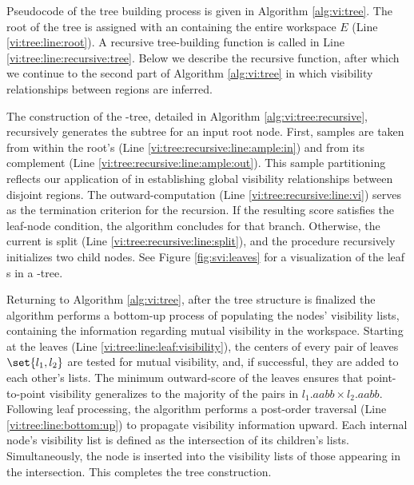 Pseudocode of the tree building process is given in Algorithm \ref{alg:vi:tree}. The root of the tree is assigned with an \aabb containing the entire workspace $E$ (Line \ref{vi:tree:line:root}). A recursive tree-building function is called in Line \ref{vi:tree:line:recursive:tree}. Below we describe the recursive function, after which we continue to the second part of Algorithm \ref{alg:vi:tree} in which visibility relationships between regions are inferred. 



The construction of the \vi-tree, detailed in Algorithm \ref{alg:vi:tree:recursive}, recursively generates the subtree for an input root node. First, samples are taken from within the root's \aabb (Line \ref{vi:tree:recursive:line:ample:in}) and from its complement (Line \ref{vi:tree:recursive:line:ample:out}). This sample partitioning reflects our application of \vi in establishing global visibility relationships between disjoint regions. The outward-\vi computation (Line \ref{vi:tree:recursive:line:vi}) serves as the termination criterion for the recursion. If the resulting score satisfies the leaf-node condition, the algorithm concludes for that branch. Otherwise, the current \aabb is split (Line \ref{vi:tree:recursive:line:split}), and the procedure recursively initializes two child nodes. See Figure \ref{fig:svi:leaves} for a visualization of the leaf \aabb{}s in a \vi-tree. 



Returning to Algorithm \ref{alg:vi:tree}, after the tree structure is finalized the algorithm performs a bottom-up process of populating the nodes' visibility lists, containing the information regarding mutual visibility in the workspace. Starting at the leaves (Line \ref{vi:tree:line:leaf:visibility}), the centers of every pair of leaves $\set{l_1,l_2}$ are tested for mutual visibility, and, if successful, they are added to each other's lists. The minimum outward-\vi score of the leaves ensures that point-to-point visibility generalizes to the majority of the pairs in $l_1.aabb \times l_2.aabb$. Following leaf processing, the algorithm performs a post-order traversal (Line \ref{vi:tree:line:bottom:up}) to propagate visibility information upward. Each internal node's visibility list is defined as the intersection of its children's lists. Simultaneously, the node is inserted into the visibility lists of those appearing in the intersection. This completes the tree construction.


